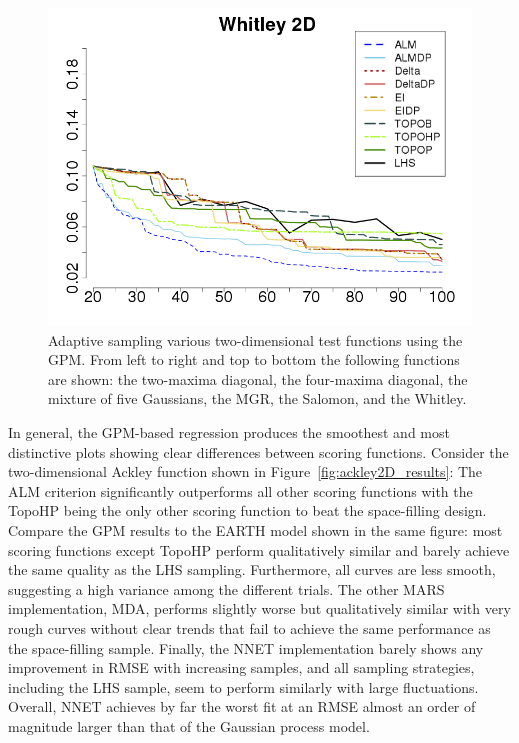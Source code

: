 \begin{figure}[htbp]
\begin{center}
 \includegraphics[width=0.45\linewidth]{figs/chap5/gpm_Whitley_td=20}
 \caption{Adaptive sampling various two-dimensional test functions using the GPM. From left to right and top to bottom the following functions are shown: the two-maxima diagonal, the four-maxima diagonal, the mixture of five Gaussians, the MGR, the Salomon, and the Whitley.}
\label{fig:2D_gpm_results}
\end{center}
\end{figure}

In general, the GPM-based regression produces the smoothest and most distinctive plots showing clear differences between scoring functions.
%
Consider the two-dimensional Ackley function shown in Figure~\ref{fig:ackley2D_results}: The ALM criterion significantly outperforms all other scoring functions with the TopoHP being the only other scoring function to beat the space-filling design.
%
Compare the GPM results to the EARTH model shown in the same figure: most scoring functions except TopoHP perform qualitatively similar and barely achieve the same quality as the LHS sampling.
%
Furthermore, all curves are less smooth, suggesting a high variance among the different trials.
%
The other MARS implementation, MDA, performs slightly worse but qualitatively similar with very rough curves without clear trends that fail to achieve the same performance as the space-filling sample.
%
Finally, the NNET implementation barely shows any improvement in RMSE with increasing samples, and all sampling strategies, including the LHS sample, seem to perform similarly with large fluctuations.
%
Overall, NNET achieves by far the worst fit at an RMSE almost an order of magnitude larger than that of the Gaussian process model.

